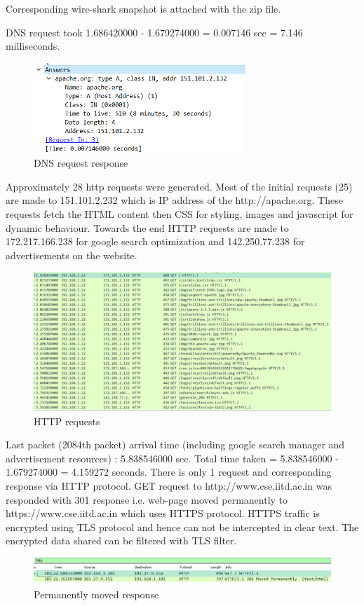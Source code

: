 \documentclass[]{assignment}
\begin{document}
Corresponding wire-shark snapshot is attached with the zip file. 
\begin{alphaparts}
    \questionpart DNS request took 1.686420000 - 1.679274000 = 0.007146 sec = 7.146 milliseconds.
    \begin{figure}[hbt!]
    \centering
    \includegraphics[width=8cm]{assignment-1/report/dnstime.png}
    \caption{DNS request response}
    \label{fig:galaxy}
    \end{figure}
    \questionpart Approximately 28 http requests were generated. Most of the initial requests (25) are made to 151.101.2.232 which is IP address of the http://apache.org. These requests fetch the HTML content then CSS for styling, images and javascript for dynamic behaviour. Towards the end HTTP requests are made to 172.217.166.238 for google search optimization and 142.250.77.238 for advertisements on the website.
    \begin{figure}[hbt!]
    \centering
    \includegraphics[width=15cm]{assignment-1/report/getrequests.png}
    \caption{HTTP requests}
    \label{fig:galaxy}
    \end{figure}
    \questionpart Last packet (2084th packet) arrival time (including google search manager and advertisement resources) : 5.838546000 sec. Total time taken = 5.838546000 - 1.679274000 = 4.159272 seconds.
    \questionpart There is only 1 request and corresponding response via HTTP protocol. GET request to http://www.cse.iitd.ac.in was responded with 301 response i.e. web-page moved permanently to https://www.cse.iitd.ac.in which uses HTTPS protocol. HTTPS traffic is encrypted using TLS protocol and hence can not be intercepted in clear text. The encrypted data shared can be filtered with TLS filter.
            \begin{figure}[hbt!]
    \centering
    \includegraphics[width=14cm]{assignment-1/report/moved.png}
    \caption{Permanently moved response}
    \label{fig:galaxy}
    \end{figure}

 \end{alphaparts}
   
\end{document}

